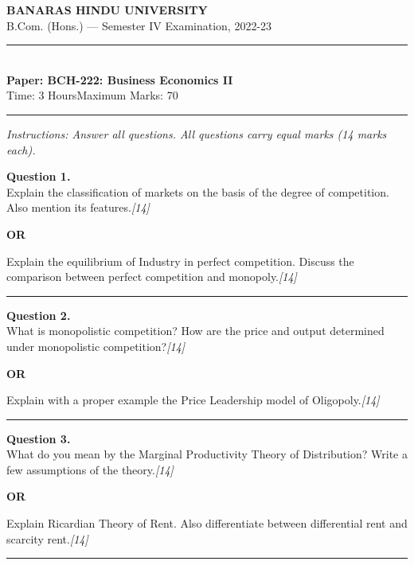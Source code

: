 \documentclass[11pt,a4paper]{article}
\newcommand{\pts}[1]{\hfill   \textit{[#1]}}
\begin{document}
\begin{center}
  {\large\bfseries BANARAS HINDU UNIVERSITY}\\[2pt]
  {\normalsize B.Com. (Hons.) --- Semester IV Examination, 2022-23}\\[6pt]
  \rule{0.8\linewidth}{0.5pt}\\[6pt]
  {\large\bfseries Paper: BCH-222: Business Economics II}\\[4pt]
  {\normalsize Time: 3 Hours\hfill Maximum Marks: 70}
\end{center}

\rule{\linewidth}{0.4pt}

\smallskip



\noindent   \textit{Instructions: Answer all questions. All questions carry equal marks (14 marks each).}

\bigskip




\noindent   \textbf{Question 1.} \\
Explain the classification of markets on the basis of the degree of competition. Also mention its features.\pts{14}

\centerline{   \textbf{OR}}

Explain the equilibrium of Industry in perfect competition. Discuss the comparison between perfect competition and monopoly.\pts{14}

\medskip\rule{\linewidth}{0.2pt}




\noindent   \textbf{Question 2.} \\
What is monopolistic competition? How are the price and output determined under monopolistic competition?\pts{14}

\centerline{   \textbf{OR}}

Explain with a proper example the Price Leadership model of Oligopoly.\pts{14}

\medskip\rule{\linewidth}{0.2pt}




\noindent   \textbf{Question 3.} \\
What do you mean by the Marginal Productivity Theory of Distribution? Write a few assumptions of the theory.\pts{14}

\centerline{   \textbf{OR}}

Explain Ricardian Theory of Rent. Also differentiate between differential rent and scarcity rent.\pts{14}

\medskip\rule{\linewidth}{0.2pt}
\end{document}
